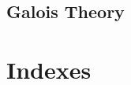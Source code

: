 \documentclass{book}
\begin{document}







\chapter{Galois Theory}




% 

\part{Indexes}


% 

\printindex[concept]
\printindex[ssr]
\printindex[coq]
\printindex[vernac]



\end{document}
